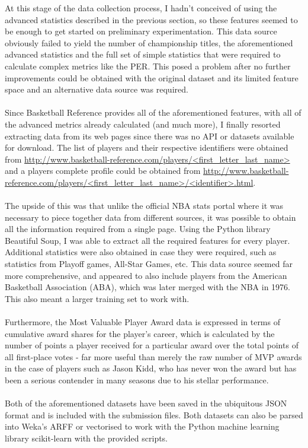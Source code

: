 \documentclass[paper=a4, fontsize=11pt]{scrartcl} %
\numberwithin{equation}{section} %
\numberwithin{figure}{section} %
\numberwithin{table}{section} %
\begin{document}
At this stage of the data collection process, I hadn't conceived of using the advanced statistics described in the previous section, so these features seemed to be enough to get started on preliminary experimentation. This data source obviously failed to yield the number of championship titles, the aforementioned advanced statistics and the full set of simple statistics that were required to calculate complex metrics like the PER. This posed a problem after no further improvements could be obtained with the original dataset and its limited feature space and an alternative data source was required.\\
\\
Since Basketball Reference provides all of the aforementioned features, with all of the advanced metrics already calculated (and much more), I finally resorted extracting data from its web pages since there was no API or datasets available for download. The list of players and their respective identifiers were obtained from \url{http://www.basketball-reference.com/players/<first_letter_last_name>} and a players complete profile could be obtained from \url{http://www.basketball-reference.com/players/<first_letter_last_name>/<identifier>.html}. \\
\\
The upside of this was that unlike the official NBA stats portal where it was necessary to piece together data from different sources, it was possible to obtain all the information required from a single page. Using the Python library Beautiful Soup, I was able to extract all the required features for every player. Additional statistics were also obtained in case they were required, such as statistics from Playoff games, All-Star Games, etc. This data source seemed far more comprehensive, and appeared to also include players from the American Basketball Association (ABA), which was later merged with the NBA in 1976. This also meant a larger training set to work with.\\
\\
Furthermore, the Most Valuable Player Award data is expressed in terms of cumulative award shares for the player's career, which is calculated by the number of points a player received for a particular award over the total points of all first-place votes\cite{mvp} - far more useful than merely the raw number of MVP awards in the case of players such as Jason Kidd, who has never won the award but has been a serious contender in many seasons due to his stellar performance.\\
\\
Both of the aforementioned datasets have been saved in the ubiquitous JSON format and is included with the submission files. Both datasets can also be parsed into Weka's ARFF or vectorised to work with the Python machine learning library scikit-learn with the provided scripts.
\end{document}
